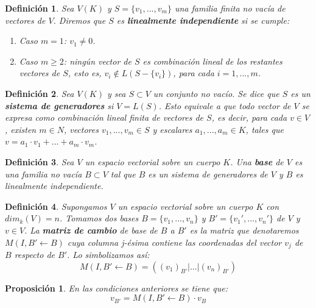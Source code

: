 \documentclass[a4paper,11pt, oneside]{book}
\newtheorem{defi}{Definición}
\newtheorem{prop}{Proposición}
\begin{document}
\begin{defi}
	Sea $V(K)$ y $S = \{v_1,...,v_m\}$ una familia finita no vacía de vectores de $V$. Diremos que $S$ es \textbf{linealmente independiente} si se cumple:
	\begin{enumerate}
		\item Caso $m=1$: $v_1 \neq 0$.
		\item Caso $m \geq 2$: ningún vector de $S$ es combinación lineal de los restantes vectores de $S$, esto es, $v_i \notin L(S -\{v_i\})$, para cada $i=1,...,m$.
	\end{enumerate}
\end{defi}
\begin{defi}
	Sea $V(K)$ y sea $S \subset V$ un conjunto no vacío. Se dice que $S$ es un \textbf{sistema de generadores} si $V = L(S)$. Esto equivale a que todo vector de $V$ se expresa como combinación lineal finita de vectores de $S$, es decir, para cada $v \in V$, existen $m \in N$, vectores $v_1,...,v_m \in S$ y escalares $a_1,...,a_m \in K$, tales que $v = a_1\cdot v_1+...+a_m\cdot v_m$.
\end{defi}
\begin{defi}
	Sea $V$ un espacio vectorial sobre un cuerpo $K$. Una \textbf{base} de $V$ es una familia no vacía $B \subset V$ tal que $B$ es un sistema de generadores de $V$ y $B$ es linealmente independiente.
\end{defi}
\begin{defi}
	Supongamos $V$ un espacio vectorial sobre un cuerpo $K$ con $dim_k(V) = n$. Tomamos dos bases $B = \{v_1,...,v_n\}$ y $B' = \{v_1',...,v_n'\}$ de $V$ y $ v \in V$. La \textbf{matriz de cambio} de base de $B$ a $B'$ es la matriz que denotaremos $M(I, B' \leftarrow B)$ cuya columna j-ésima contiene las coordenadas del vector $v_j$ de $B$ respecto de $B'$. Lo simbolizamos así:
	\begin{equation}
	M(I, B' \leftarrow B) = ((v_1)_{B'} | ... |(v_n)_{B'})
	\end{equation}
\end{defi}
\begin{prop}
	En las condiciones anteriores se tiene que:
	\begin{equation}
	v_{B'} = M(I, B' \leftarrow B)\cdot  v_B
	\end{equation}
\end{prop}
\end{document}
